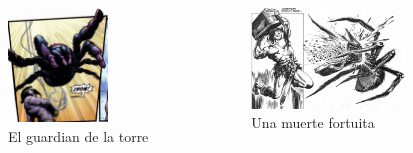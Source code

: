 \begin{frame}{}
\begin{columns}
    \begin{figure}[htb]
    \centering
        \includegraphics[width=0.7\textwidth]{img/res/13}
        \caption{El guardian de la torre}
    \end{figure}
    \begin{figure}[htb]
    \centering
        \includegraphics[width=0.85\textwidth]{img/res/14}
        \caption{Una muerte fortuita}
    \end{figure}
\end{columns}
\end{frame}

